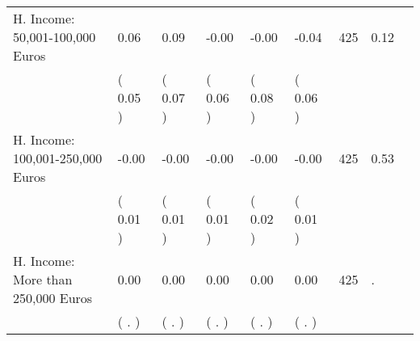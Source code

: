 \begin{tabular}{L{6.2cm} C{1.8cm} C{1.8cm} C{1.8cm} C{1.8cm} C{1.8cm} C{1.8cm} C{0.3cm} C{0.3cm}}
H. Income: 50,001-100,000 Euros &      0.06 &      0.09 &     -0.00 &     -0.00 &     -0.04  & 425 &       0.12 \\ 
 & (     0.05 ) & (     0.07 ) & (     0.06 ) & (     0.08 ) & (     0.06 )  & \\
H. Income: 100,001-250,000 Euros &     -0.00 &     -0.00 &     -0.00 &     -0.00 &     -0.00  & 425 &       0.53 \\ 
 & (     0.01 ) & (     0.01 ) & (     0.01 ) & (     0.02 ) & (     0.01 )  & \\
H. Income: More than 250,000 Euros &      0.00 &      0.00 &      0.00 &      0.00 &      0.00  & 425 &          . \\ 
 & (        . ) & (        . ) & (        . ) & (        . ) & (        . )  & \\
\bottomrule
\end{tabular}
